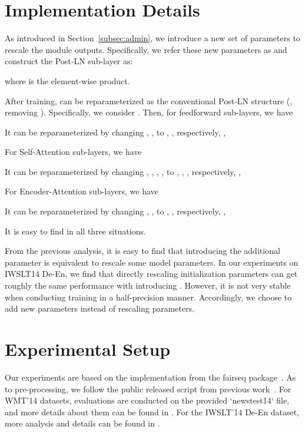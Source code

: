 \section{\our Implementation Details}
\label{appendix:implement}

As introduced in Section~\ref{subsec:admin}, we introduce a new set of parameters to rescale the module outputs. 
Specifically, we refer these new parameters as  and construct the Post-LN sub-layer as:

where  is the element-wise product. 

After training, \our can be reparameterized as the conventional Post-LN structure (\ie, removing ). 
Specifically, we consider . 
Then, for feedforward sub-layers, we have

It can be reparameterized by changing , ,  to , ,  respectively, \ie, 

For Self-Attention sub-layers, we have 
 
It can be reparameterized by changing , , , ,  to , , ,   respectively, \ie, 

For Encoder-Attention sub-layers, we have 
 
It can be reparameterized by changing , ,  to , ,  respectively, \ie, 

It is easy to find  in all three situations. 

From the previous analysis, it is easy to find that introducing the additional parameter  is equivalent to rescale some model parameters. 
In our experiments on IWSLT14 De-En, we find that directly rescaling initialization parameters can get roughly the same performance with introducing . 
However, it is not very stable when conducting training in a half-precision manner. 
Accordingly, we choose to add new parameters  instead of rescaling parameters. 

\section{Experimental Setup}
\label{appendix:exp}

Our experiments are based on the implementation from the fairseq package~\citep{ott2019fairseq}.
As to pre-processing, we follow the public released script from previous work~\citep{ott2019fairseq,lu2020understanding}. 
For WMT'14 datasets, evaluations are conducted on the provided `newstest14` file, and more details about them can be found in \citet{bojar2014findings}. 
For the IWSLT'14 De-En dataset, more analysis and details can be found in \citet{cettolo2014report}. 

